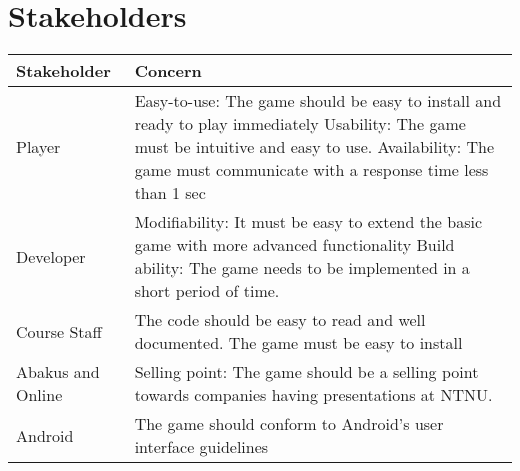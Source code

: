 \section{Stakeholders} 
\label{sec:stakeholders}

\begin{tabular}{|m{}|m{}|}
\hline
Stakeholder & Concern \\ \hline
Player & Easy-to-use: The game should be easy to install and ready to play immediately \newline
Usability: The game must be intuitive and easy to use. \newline
Availability: The game must communicate with a response time less than 1 sec\\ \hline 
Developer & Modifiability: It must be easy to extend the basic game with more advanced functionality \newline
Build ability: The game needs to be implemented in a short period of time.\\ \hline
Course Staff & The code should be easy to read and well documented. The game must be easy to install \\ \hline
Abakus and Online & Selling point: The game should be a selling point towards companies having presentations at NTNU. \\ \hline
Android & The game should conform to Android's user interface guidelines\cite{website:android} \\ \hline
\end{tabular}

